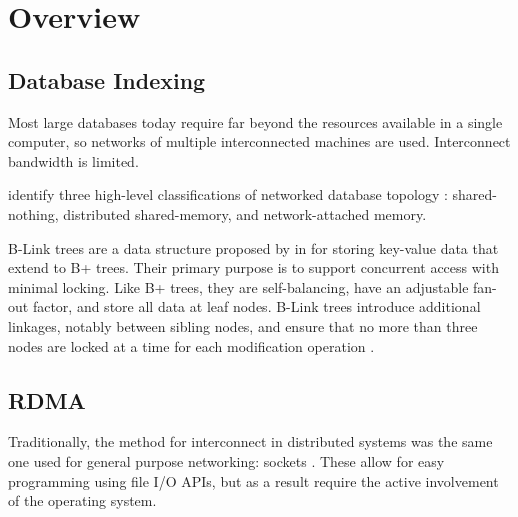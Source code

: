 \section{Overview}

\subsection{Database Indexing}

Most large databases today require far beyond the resources available in a single computer, so networks of multiple interconnected machines are used. Interconnect bandwidth is limited.

\citeauthor{binnig-vldb-2016} identify three high-level classifications of networked database topology \cite{binnig-vldb-2016}: shared-nothing, distributed shared-memory, and network-attached memory.


B-Link trees are a data structure proposed by \citeauthor{b-link} in \citeyear{b-link} for storing key-value data that extend to B+ trees.
Their primary purpose is to support concurrent access with minimal locking.
Like B+ trees, they are self-balancing, have an adjustable fan-out factor, and store all data at leaf nodes.
B-Link trees introduce additional linkages, notably between sibling nodes, and ensure that no more than three nodes are locked at a time for each modification operation \cite{b-link}.


\subsection{RDMA}

Traditionally, the method for interconnect in distributed systems was the same one used for general purpose networking: sockets \cite{binnig-vldb-2016}. These allow for easy programming using file I/O APIs, but as a result require the active involvement of the operating system.

